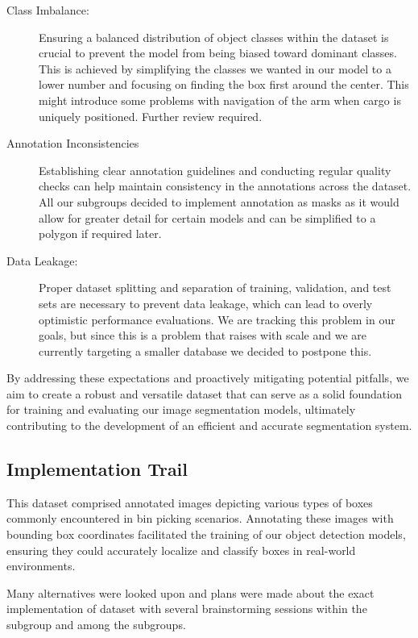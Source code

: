 \begin{description}
      \item[Class Imbalance:] Ensuring a balanced distribution of object classes within the dataset is crucial to prevent the model from being biased toward dominant classes. This is achieved by simplifying the classes we wanted in our model to a lower number and focusing on finding the box first around the center. This might introduce some problems with navigation of the arm when cargo is uniquely positioned. Further review required.
      \item[Annotation Inconsistencies] Establishing clear annotation guidelines and conducting regular quality checks can help maintain consistency in the annotations across the dataset. All our subgroups decided to implement annotation as masks as it would allow for greater detail for certain models and can be simplified to a polygon if required later.
      \item[Data Leakage:] Proper dataset splitting and separation of training, validation, and test sets are necessary to prevent data leakage, which can lead to overly optimistic performance evaluations. We are tracking this problem in our goals, but since this is a problem that raises with scale and we are currently targeting a smaller database we decided to postpone this.
\end{description}

By addressing these expectations and proactively mitigating potential pitfalls, we aim to create a robust and versatile dataset that can serve as a solid foundation for training and evaluating our image segmentation models, ultimately contributing to the development of an efficient and accurate segmentation system.

\subsection{Implementation Trail}
This dataset comprised annotated images depicting various types of boxes commonly encountered in bin picking scenarios. Annotating these images with bounding box coordinates facilitated the training of our object detection models, ensuring they could accurately localize and classify boxes in real-world environments.

Many alternatives were looked upon and plans were made about the exact implementation of dataset with several brainstorming sessions within the subgroup and among the subgroups.

